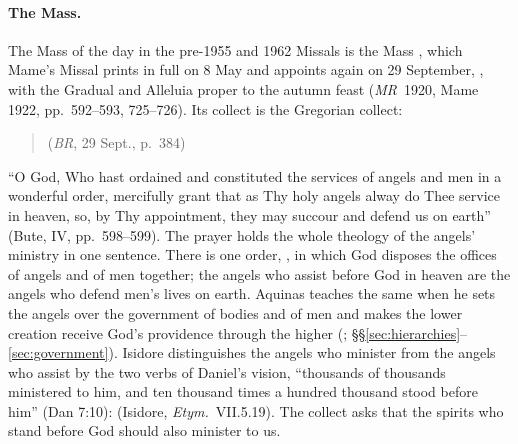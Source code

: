 \paragraph{The Mass.} The Mass of the day in the pre-1955 and 1962
Missals is the Mass , which Mame's Missal prints in
full on 8 May and appoints again on 29 September, , with the Gradual and Alleluia proper to
the autumn feast (\emph{MR}~1920, Mame 1922, pp.~592--593, 725--726). Its collect is the
Gregorian collect:
\begin{quote}
(\emph{BR}, 29 Sept., p.~384)
\end{quote}
``O God, Who hast ordained and constituted the services of angels and men
in a wonderful order, mercifully grant that as Thy holy angels alway do
Thee service in heaven, so, by Thy appointment, they may succour and
defend us on earth'' (Bute, IV, pp.~598--599). The prayer holds the whole
theology of the angels' ministry in one sentence. There is one order,
, in which God disposes the offices of angels and of
men together; the angels who assist before God in heaven are the angels
who defend men's lives on earth. Aquinas teaches the same when he sets the
angels over the government of bodies and of men and makes the lower
creation receive God's providence through the higher (; \S\S\ref{sec:hierarchies}--\ref{sec:government}).
Isidore distinguishes the angels who minister from the angels who
assist by the two verbs of Daniel's vision, ``thousands of thousands
ministered to him, and ten thousand times a hundred thousand stood before
him'' (Dan 7:10): 
(Isidore, \emph{Etym.}\ VII.5.19). The collect asks that the spirits who
stand before God should also minister to us.

